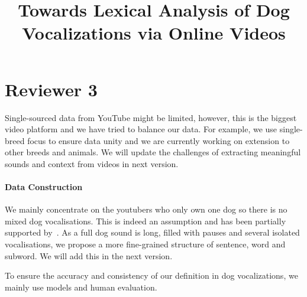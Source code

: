 \documentclass[letterpaper]{article}
\title{Towards Lexical Analysis of Dog Vocalizations via Online Videos}
\newcommand{\MY}[1]{\textcolor{orange}{(Mengyue: #1)}}
\begin{document}


\section{Reviewer 3}
Single-sourced data from YouTube might be limited, however, this is the biggest video platform and we have tried to balance our data. For example, we use single-breed focus to ensure data unity and we are currently working on extension to other breeds and animals. We will update the challenges of extracting meaningful sounds and context from videos in next version. 

\paragraph{Data Construction}
We mainly concentrate on the youtubers who only own one dog so there is no mixed dog vocalisations. 
% 
This is indeed an assumption and has been partially supported by~\cite{jieyiacl2023}. As a full dog sound is long, filled with pauses and several isolated vocalisations, we propose a more fine-grained structure of sentence, word and subword. We will add this in the next version. 

To ensure the accuracy and consistency of our definition in dog vocalizations, we mainly use models and human evaluation.
\end{document}
